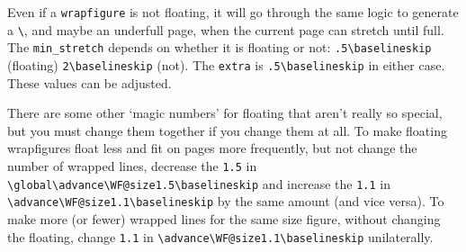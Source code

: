 \documentclass[pagesize=auto]{scrartcl}
\makeatletter
\newcommand*{\cs}[1]{\texttt{\textbackslash#1}}
\newcommand*{\cmd}[1]{\cs{\expandafter\@gobble\string#1}}
\newcommand*{\env}[1]{\texttt{#1}}
\makeatother
\begin{document}
Even if a \env{wrapfigure} is not floating, it will go through the same logic
to generate a \cmd{\pagebreak}, and maybe an underfull page, when the current
page can stretch until full.  The \texttt{min\_stretch} depends on whether it is
floating or not: \verb+.5\baselineskip+ (floating) \verb+2\baselineskip+ (not). The
\texttt{extra} is \verb+.5\baselineskip+ in either case.  These values can be adjusted.

There are some other `magic numbers' for floating that aren't really so
special, but you must change them together if you change them at all.
To make floating wrapfigures float less and fit on pages more frequently,
but not change the number of wrapped lines, decrease the \texttt{1.5} in
\verb+\global\advance\WF@size1.5\baselineskip+ and increase the \texttt{1.1} in
\verb+\advance\WF@size1.1\baselineskip+ by the same amount (and vice versa).
To make more (or fewer) wrapped lines for the same size figure, without
changing the floating, change \texttt{1.1} in \verb+\advance\WF@size1.1\baselineskip+
unilaterally.
\end{document}
